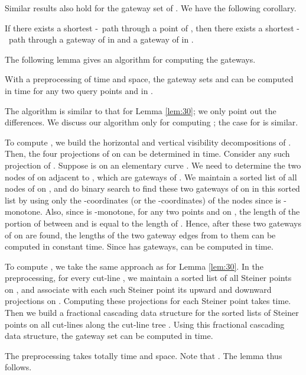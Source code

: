 \documentclass[english,runningheads,11pt]{llncs}
\def\st{-}
\newenvironment{proof}{\noindent {\textbf{Proof:}}\rm}{\hfill \rm}
\begin{document}
Similar results also hold for the gateway set  of .
We have the following corollary.

\begin{corollary}\label{cor:20}
If there exists a shortest \st\ path through a point of
, then there exists a shortest \st\ path through a gateway of
 in  and a gateway of  in .
\end{corollary}

The following lemma gives an algorithm for computing the gateways.

\begin{lemma}\label{lem:70}
With a preprocessing of  time and
 space,
the gateway sets 
and  can be computed in
 time for any two query points  and  in .
\end{lemma}
\begin{proof}
The algorithm is similar to that for Lemma \ref{lem:30}; we only point
out the differences. We discuss our algorithm only for computing
; the case for  is similar.

To compute , we build the horizontal and vertical
visibility decompositions of .
Then, the four projections of  on  can be determined
in  time. Consider
any such projection  of . Suppose  is on an elementary curve . We need to
determine the two nodes of  on  adjacent to ,
which are gateways of .
We maintain a sorted list of all nodes of  on , and
do binary search to find these two gateways of  on  in
this sorted list by using only the -coordinates (or the
-coordinates) of the nodes since  is
-monotone. Also, since  is -monotone, for any two points
 and  on , the length of the portion of  between  and
 is equal to the length of . Hence, after these
two gateways of  on  are found, the lengths of the two gateway
edges from  to them can be
computed in constant time. Since  has 
gateways,  can be computed in  time.

To compute , we take the same approach as for Lemma \ref{lem:30}.
In the preprocessing, for every cut-line , we maintain a sorted list of all Steiner points
on , and associate with each such Steiner point its upward and downward projections
on .
Computing these projections for each Steiner point takes  time.
Then we build a fractional cascading data structure \cite{ref:ChazelleFr86} for
the sorted lists of Steiner points on all cut-lines along the cut-line tree
. Using this fractional cascading data structure, the gateway set
 can be computed in  time.

The preprocessing takes totally  time and
 space.
Note that
.
The lemma thus follows.
\end{proof}
\end{document}
